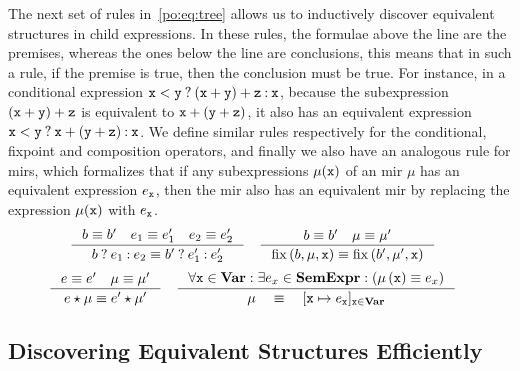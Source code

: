 The next set of rules in~\eqref{po:eq:tree} allows us to inductively discover
equivalent structures in child expressions.  In these rules, the formulae above
the line are the premises, whereas the ones below the line are conclusions,
this means that in such a rule, if the premise is true, then the conclusion
must be true.  For instance, in a conditional expression $\texttt{x} <
\texttt{y}\mathbin{?}(\texttt{x} + \texttt{y}) + \texttt{z}\mathbin{:}\texttt{x}$, because the subexpression $(\texttt{x}
+ \texttt{y}) + \texttt{z}$ is equivalent to $\texttt{x} + (\texttt{y} + \texttt{z})$, it also
has an equivalent expression $\texttt{x} < \texttt{y}\mathbin{?}\texttt{x} + (\texttt{y} +
\texttt{z})\mathbin{:}\texttt{x}$.  We define similar rules respectively for the conditional,
fixpoint and composition operators, and finally we also have an analogous rule
for \glspl{mir}, which formalizes that if any subexpressions $\mu(\texttt{x})$ of
an \gls{mir} $\mu$ has an equivalent expression $e_{\texttt{x}}$, then the \gls{mir}
also has an equivalent \gls{mir} by replacing the expression $\mu(\texttt{x})$ with
$e_{\texttt{x}}$.
\begin{equation}
    \begin{aligned}
        \inference{%
            b \eqrel b^\prime \quad
            e_1 \eqrel e^\prime_1 \quad
            e_2 \eqrel e^\prime_2
        }{%
            \select{b}{e_1}{e_2} \eqrel
            \select{b^\prime}{e^\prime_1}{e^\prime_2}
        }
        & \quad
        \inference{%
            b \eqrel b^\prime \quad
            \mu \eqrel \mu^\prime
        }{%
            \fix\left(b, \mu, \varx\right) \eqrel
            \fix\left(b^\prime, \mu^\prime, \varx\right)
        }
    \end{aligned}
    \nonumber
\end{equation}
\vspace{-10pt}
\begin{equation}
    \begin{aligned}
        \inference{%
            e \eqrel e^\prime \quad
            \mu \eqrel \mu^\prime
        }{%
            e \expand \mu \eqrel e^\prime \expand \mu^\prime
        }
        & \quad
        \inference{%
            \forall \varx \in \varset:
            \exists e_x \in \sexprset:
            \left( \mu\left(\varx\right) \eqrel e_x \right)
        }{%
            \mu \quad \eqrel \quad [\varx \mapsto e_\varx]_{\varx \in \varset}
        }
    \end{aligned}
    \label{po:eq:tree}
\end{equation}


\subsection{Discovering Equivalent Structures Efficiently}

